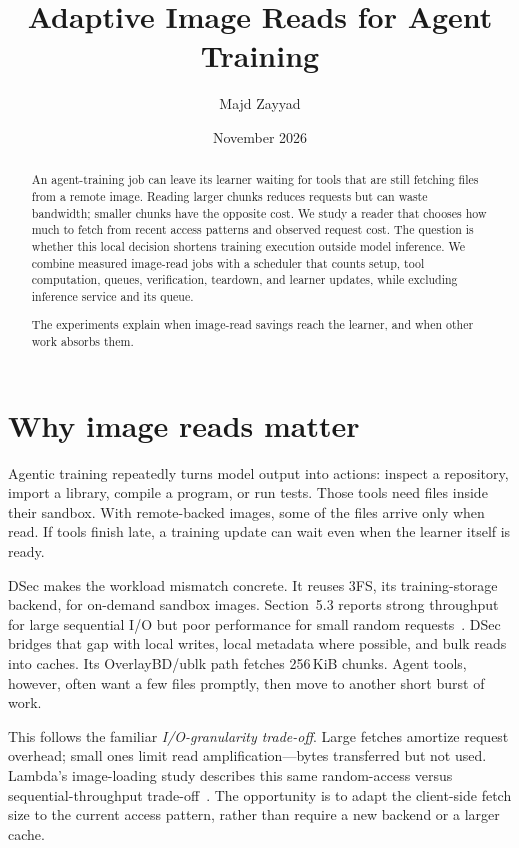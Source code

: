 \documentclass[10pt,twocolumn]{article}
\title{\bfseries Adaptive Image Reads for Agent Training}
\author{Majd Zayyad}
\date{November 2026}
\begin{document}
\maketitle

\begin{abstract}
An agent-training job can leave its learner waiting for tools that are
still fetching files from a remote image. Reading larger chunks reduces
requests but can waste bandwidth; smaller chunks have the opposite cost.
We study a reader that chooses how much to fetch from recent access
patterns and observed request cost. The question is whether this local
decision shortens training execution outside model inference.
We combine measured image-read jobs with a scheduler that counts setup,
tool computation, queues, verification, teardown, and learner updates,
while excluding inference service and its queue.

The experiments explain when image-read savings reach the learner, and
when other work absorbs them.
\end{abstract}

\section{Why image reads matter}
Agentic training repeatedly turns model output into actions: inspect a
repository, import a library, compile a program, or run tests. Those tools
need files inside their sandbox. With remote-backed images, some of the
files arrive only when read. If tools finish late, a training update can
wait even when the learner itself is ready.

DSec makes the workload mismatch concrete. It reuses 3FS, its
training-storage backend, for on-demand sandbox images. Section~5.3
reports strong throughput for large sequential I/O but poor performance
for small random requests~\cite{dsec2026}. DSec bridges that gap with
local writes, local metadata where possible, and bulk reads into caches.
Its OverlayBD/ublk path fetches 256\,KiB chunks. Agent tools, however,
often want a few files promptly, then move to another short burst of work.

This follows the familiar \emph{I/O-granularity trade-off}.
Large fetches amortize request overhead; small ones limit read
amplification---bytes transferred but not used. Lambda's image-loading
study describes this same random-access versus sequential-throughput
trade-off~\cite{lambda2023}. The opportunity is to adapt the client-side
fetch size to the current access pattern, rather than require a new
backend or a larger cache.
\end{document}
